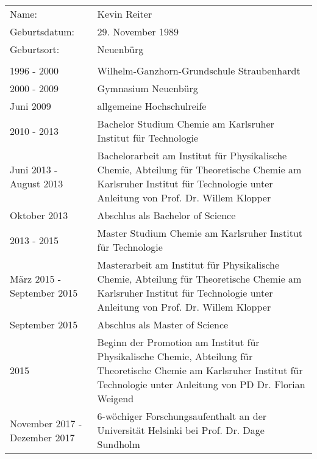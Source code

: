 \renewcommand{\arraystretch}{1.7}
\begin{singlespace}
\begin{tabular}{lp{7.6cm}}
Name: & Kevin Reiter \\ 

Geburtsdatum: & 29. November 1989 \\ 

Geburtsort: & Neuenbürg \\ 

\quad & \quad \\

1996 - 2000 & Wilhelm-Ganzhorn-Grundschule Straubenhardt \\ 

2000 - 2009 & Gymnasium Neuenbürg \\ 

Juni 2009 & allgemeine Hochschulreife \\ 

2010 - 2013 & Bachelor Studium Chemie am Karlsruher Institut für Technologie  \\ 
Juni 2013 - August 2013  & Bachelorarbeit am Institut für Physikalische Chemie, Abteilung für Theoretische Chemie am Karlsruher Institut für Technologie unter Anleitung von Prof. Dr. Willem Klopper \\

Oktober 2013 & Abschlus als Bachelor of Science \\ 
 
2013 - 2015 & Master Studium Chemie am Karlsruher Institut für Technologie \\ 

März 2015 - September 2015  & Masterarbeit am Institut für Physikalische Chemie, Abteilung für Theoretische Chemie am Karlsruher Institut für Technologie unter Anleitung von Prof. Dr. Willem Klopper \\

September 2015 & Abschlus als Master of Science \\ 

2015 & Beginn der Promotion am Institut für Physikalische Chemie, Abteilung für Theoretische Chemie am Karlsruher Institut für Technologie unter Anleitung von PD Dr. Florian Weigend \\ 

November 2017 - Dezember 2017 & 6-wöchiger Forschungsaufenthalt an der Universität Helsinki bei Prof. Dr. Dage Sundholm \\ 
\end{tabular}  
\end{singlespace}
\enlargethispage{13.5pt}
\vfill
